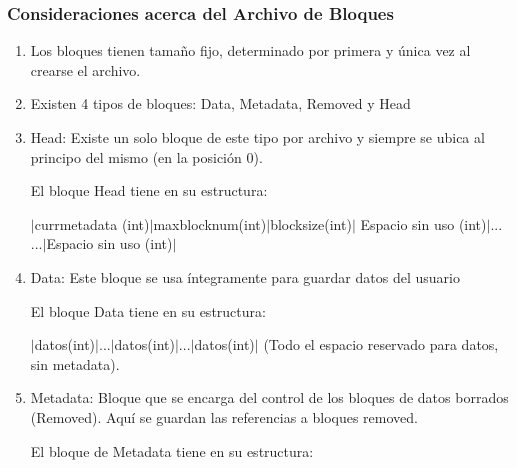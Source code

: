 \documentclass[a4paper,10pt]{article}
\begin{document}
\subsubsection{Consideraciones acerca del Archivo de Bloques}

\begin{enumerate}
\item Los bloques tienen tamaño fijo, determinado por primera y única vez al crearse el archivo.
\item Existen 4 tipos de bloques: Data, Metadata, Removed y Head
\item Head: Existe un solo bloque de este tipo por archivo y siempre se ubica al principo del mismo (en la posición 0).

El bloque Head tiene en su estructura: 

$\vert$currmetadata (int)$\vert$maxblocknum(int)$\vert$blocksize(int)$\vert$ Espacio sin uso (int)$\vert$...
...$\vert$Espacio sin uso (int)$\vert$  
\item Data: Este bloque se usa íntegramente para guardar datos del usuario

El bloque Data tiene en su estructura: 

$\vert$datos(int)$\vert$...$\vert$datos(int)$\vert$...$\vert$datos(int)$\vert$
(Todo el espacio reservado para datos, sin metadata).
\item Metadata: Bloque que se encarga del control de los bloques de datos borrados (Removed). Aquí se guardan las referencias a bloques removed.

El bloque de Metadata tiene en su estructura: 


\end{enumerate}
\end{document}
